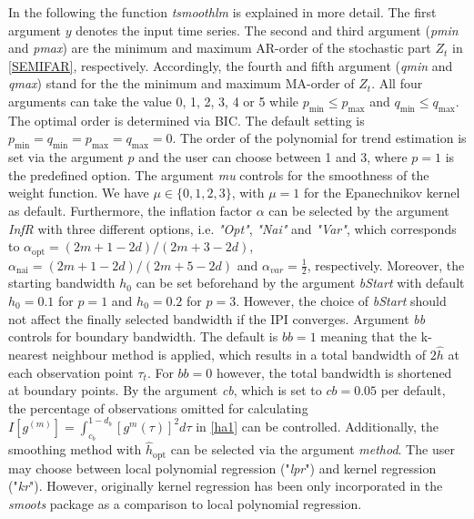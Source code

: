 \documentclass[12pt]{article}
\begin{document}
In the following the function \textit{tsmoothlm} is explained in more detail. The first argument $y$ denotes the input time series. The second and third argument (\textit{pmin} and \textit{pmax}) are the minimum and maximum AR-order of the stochastic part $Z_t$ in \eqref{SEMIFAR}, respectively. Accordingly, the fourth and fifth argument (\textit{qmin} and \textit{qmax}) stand for the the minimum and maximum MA-order of $Z_t$. All four arguments can take the value 0, 1, 2, 3, 4 or 5 while $p_{\text{min}} \leq  p_{\text{max}}$ and $q_{\text{min}} \leq  q_{\text{max}}$. The optimal order is determined via BIC. The default setting is $p_{\text{min}} = q_{\text{min}} = p_{\text{max}} = q_{\text{max}} = 0$. The order of the polynomial for trend estimation is set via the argument $p$ and the user can choose between 1 and 3, where $p = 1$ is the predefined option. The argument \textit{mu} controls for the smoothness of the weight function. We have $\mu \in \{0,1,2,3\}$, with $\mu = 1$ for the Epanechnikov kernel as default. Furthermore, the inflation factor $\alpha$ can be selected by the argument \textit{InfR} with three different options, i.e. \textit{"Opt"}, \textit{"Nai"} and \textit{"Var"}, which corresponds to $\alpha_{\text{opt}} = (2m + 1 - 2d) / (2m + 3 - 2d)$, $\alpha_{\text{nai}} = (2m + 1 - 2d) / (2m + 5 - 2d)$ and $\alpha_{var} = \frac{1}{2}$, respectively.
Moreover, the starting bandwidth $h_0$ can be set beforehand by the argument \textit{bStart} with default $h_0 = 0.1$ for $p =1$ and $h_0 = 0.2$ for $p = 3$. However, the choice of \textit{bStart} should not affect the finally selected bandwidth if the IPI converges. Argument \textit{bb} controls for boundary bandwidth. The default is $bb = 1$ meaning that the k-nearest neighbour method is applied, which results in a total bandwidth of $2\hat{h}$ at each observation point $\tau_t$. For $\textit{bb} = 0$ however, the total bandwidth is shortened at boundary points. By the argument \textit{cb}, which is set to $\textit{cb} = 0.05$ per default, the percentage of observations omitted for calculating $I[g^{(m)}] = \int_{c_b}^{1-d_b}[g^{m}(\tau)]^2d\tau$ in \eqref{ha1} can be controlled. Additionally, the smoothing method with $\hat{h}_{\text{opt}}$ can be selected via the argument \textit{method}. The user may choose between local polynomial regression ("\textit{lpr}") and kernel regression ("\textit{kr}"). However, originally kernel regression has been only incorporated in the \textit{smoots} package as a comparison to local polynomial regression.
\end{document}
